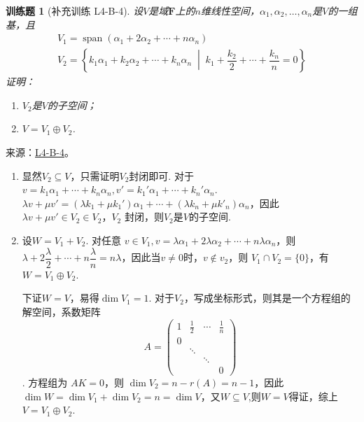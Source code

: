 \documentclass[12pt,fontset=fandol]{ctexart}
\newtheorem{exercise}{训练题}[section]
\begin{document}
\begin{exercise}[补充训练 L4-B-4]\label{prob:L4-B-4}
设$V$是域$\mathbf{F}$上的$n$维线性空间，$\alpha_1,\alpha_2,\ldots,\alpha_n$是$V$的一组基，且
        \begin{gather*}
            V_1=\operatorname{span}(\alpha_1+2\alpha_2+\cdots+n\alpha_n) \\
            V_2=\left\{k_1\alpha_1+k_2\alpha_2+\cdots+k_n\alpha_n \;\middle|\; k_1+\dfrac{k_2}{2}+\cdots+\dfrac{k_n}{n}=0\right\}
        \end{gather*}
        证明：
        \begin{enumerate}
            \item $V_2$是$V$的子空间；

            \item $V=V_1\oplus V_2$.
        \end{enumerate}
\end{exercise}
\noindent 来源：\href{https://github.com/yhwu-is/Linear-Algebra-Left-Undone/blob/new/%E8%AE%B2%E4%B9%89/%E4%B8%93%E9%A2%98/4%20%E7%BA%BF%E6%80%A7%E7%A9%BA%E9%97%B4%E7%9A%84%E8%BF%90%E7%AE%97.tex}{L4-B-4}。
\begin{solve}
\begin{enumerate}
                \item 显然$V_2\subseteq V$，只需证明$V_2$封闭即可. 对于$v=k_1\alpha_1+\cdots+k_n\alpha_n,v'=k_1'\alpha_1+\cdots+k_n'\alpha_n$. $\lambda v+\mu v'=(\lambda k_1+\mu k_1')\alpha_1+\cdots+(\lambda k_n+\mu k'_n)\alpha_n$，因此  $\lambda v+\mu v'\in V_2\in V_2$，$V_2$ 封闭，则$V_2$是$V$的子空间.

                \item 设$W=V_1+V_2$. 对任意 $v\in V_1,v=\lambda \alpha_1+2\lambda\alpha_2+\cdots+n\lambda\alpha_n$，则 $\lambda+2\dfrac{\lambda}2+\allowbreak\cdots+n\dfrac{\lambda}n=n\lambda$，因此当$v\ne 0$时，$v\not\in v_2$，则 $V_1\cap V_2=\{0\}$，有$W=V_1\oplus V_2$.

                      下证$W=V$，易得$\dim V_1=1$. 对于$V_2$，写成坐标形式，则其是一个方程组的解空间，系数矩阵 
\[A=\begin{pmatrix}
                              1 & \frac 12 & \cdots & \frac 1n \\
                              0 &          &        &          \\
                                & \ddots   &        &          \\
                                &          & \ddots &          \\
                                &          &        & 0
                          \end{pmatrix}\]
. 方程组为 $AK=0$，则 $\dim V_2=n-r(A)=n-1$，因此$\dim W=\dim V_1+\dim V_2=n=\dim V$，又$W\subseteq V$,则$W=V$得证，综上$V=V_1\oplus V_2$.
            \end{enumerate}
\end{solve}
\end{document}
